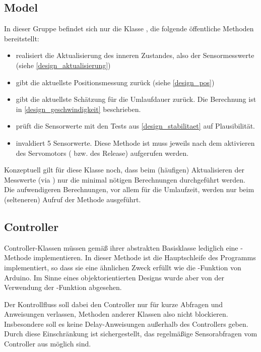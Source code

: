 \subsection{Model}
In dieser Gruppe befindet sich nur die Klasse , die folgende öffentliche Methoden bereitstellt:
\begin{itemize}
	\item {} realisiert die Aktualisierung des inneren Zustandes, also der Sensormesswerte (siehe \cref{design_aktualisierung})
	\item {} gibt die aktuellste Positionsmessung zurück (siehe \cref{design_pos})
	\item {} gibt die aktuellste Schätzung für die Umlaufdauer zurück.
	Die Berechnung ist in \cref{design_geschwindigkeit} beschrieben.
	\item {} prüft die Sensorwerte mit den Tests aus \cref{design_stabilitaet} auf Plausibilität.
	\item {} invaldiert 5 Sensorwerte.
	Diese Methode ist muss jeweils nach dem aktivieren des Servomotors ( bzw.  des Release) aufgerufen werden.
\end{itemize}

Konzeptuell gilt für diese Klasse noch, dass beim (häufigen) Aktualisieren der Messwerte (via ) nur die minimal nötigen Berechnungen durchgeführt werden.
Die aufwendigeren Berechnungen, vor allem für die Umlaufzeit, werden nur beim (selteneren) Aufruf der Methode  ausgeführt.

\subsection{Controller}
Controller-Klassen müssen gemäß ihrer abstrakten Basisklasse  lediglich eine -Methode implementieren.
In dieser Methode ist die Hauptschleife des Programms implementiert, so dass sie eine ähnlichen Zweck erfüllt wie die -Funktion von Arduino.
Im Sinne eines objektorientierten Designs wurde aber von der Verwendung der -Funktion abgesehen.

Der Kontrollfluss soll dabei den Controller nur für kurze Abfragen und Anweisungen verlassen, Methoden anderer Klassen also nicht blockieren.
Insbesondere soll es keine Delay-Anweisungen außerhalb des Controllers geben.
Durch diese Einschränkung ist sichergestellt, das regelmäßige Sensorabfragen vom Controller aus möglich sind.

